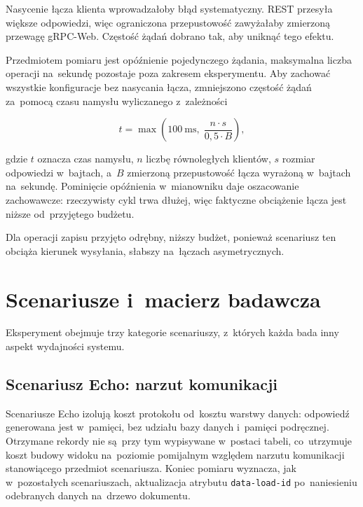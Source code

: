 Nasycenie łącza klienta wprowadzałoby błąd systematyczny. REST przesyła większe odpowiedzi, więc ograniczona przepustowość zawyżałaby zmierzoną przewagę gRPC-Web. Częstość żądań dobrano tak, aby uniknąć tego efektu.

Przedmiotem pomiaru jest opóźnienie pojedynczego żądania, maksymalna liczba operacji na~sekundę pozostaje poza zakresem eksperymentu. Aby zachować wszystkie konfiguracje bez nasycania łącza, zmniejszono częstość żądań za~pomocą czasu namysłu wyliczanego z~zależności

\begin{equation}
t = \max\left(100~\mathrm{ms},\; \frac{n \cdot s}{0{,}5 \cdot B}\right),
\label{eq:ThinkTime}
\end{equation}

gdzie $t$ oznacza czas namysłu, $n$ liczbę równoległych klientów, $s$ rozmiar odpowiedzi w~bajtach, a~$B$ zmierzoną przepustowość łącza wyrażoną w~bajtach na~sekundę. Pominięcie opóźnienia w~mianowniku daje oszacowanie zachowawcze: rzeczywisty cykl trwa dłużej, więc faktyczne obciążenie łącza jest niższe od~przyjętego budżetu.

Dla operacji zapisu przyjęto odrębny, niższy budżet, ponieważ scenariusz ten obciąża kierunek wysyłania, słabszy na~łączach asymetrycznych.

\section{Scenariusze i~macierz badawcza}
\label{sec:ScenariuszeTestowe}

Eksperyment obejmuje trzy kategorie scenariuszy, z~których każda bada inny aspekt wydajności systemu.

\subsection{Scenariusz Echo: narzut komunikacji}
\label{subsec:ScenariuszEcho}

Scenariusze Echo izolują koszt protokołu od~kosztu warstwy danych: odpowiedź generowana jest w~pamięci, bez udziału bazy danych i~pamięci podręcznej. Otrzymane rekordy nie są~przy tym wypisywane w~postaci tabeli, co~utrzymuje koszt budowy widoku na~poziomie pomijalnym względem narzutu komunikacji stanowiącego przedmiot scenariusza. Koniec pomiaru wyznacza, jak w~pozostałych scenariuszach, aktualizacja atrybutu \texttt{data-load-id} po~naniesieniu odebranych danych na~drzewo dokumentu.

